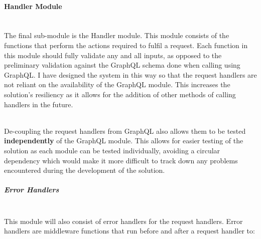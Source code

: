 \documentclass[../../main.tex]{subfiles}
\begin{document}
\paragraph{Handler Module}

\paragraph{} %

\noindent \\ The final sub-module is the Handler module. This module consists of
the functions that perform the actions required to fulfil a request.
Each function in this module should fully validate any and all inputs, as opposed
to the preliminary validation against the GraphQL schema done when calling using GraphQL.
I have designed the system in this way so that the request handlers are not reliant
on the availability of the GraphQL module. This increases the solution's resiliency
as it allows for the addition of other methods of calling handlers in the future.

\noindent \\ De-coupling the request handlers from GraphQL also allows them to be
tested \textbf{independently} of the GraphQL module. This allows for easier
testing of the solution as each module can be tested individually,  avoiding
a circular dependency which would make it more difficult to track down any problems
encountered during the development of the solution.

\subparagraph{Error Handlers\\}

\noindent \\ This module will also consist of error handlers for the request handlers.
Error handlers are middleware functions that run before and after a request handler to:
\end{document}
